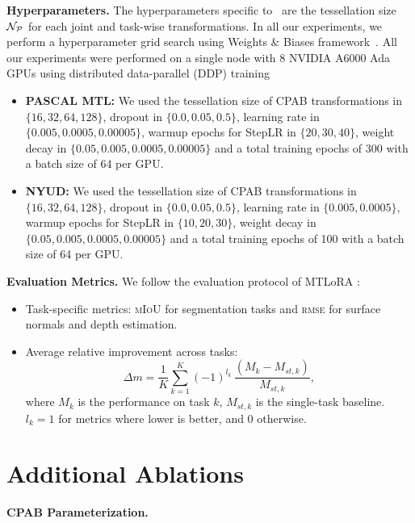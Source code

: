 \noindent\textbf{Hyperparameters.} The hyperparameters specific to \ourmethod\ are the tessellation size ${\mathcal{N}}_{\mathcal{P}}$ for each joint and task-wise transformations. In all our experiments, we perform a hyperparameter grid search using Weights \& Biases framework~\cite {wandb}. All our experiments were performed on a single node with 8 NVIDIA A6000 Ada GPUs using distributed data-parallel (DDP) training
\begin{itemize}
    \item \textbf{PASCAL MTL:} We used the tessellation size of CPAB transformations in $\{16, 32, 64, 128\}$, dropout in $\{0.0, 0.05, 0.5\}$, learning rate in $\{0.005, 0.0005, 0.00005\}$, warmup epochs for StepLR in $\{20, 30, 40\}$, weight decay in $\{0.05, 0.005, 0.0005, 0.00005\}$ and a total training epochs of 300 with a batch size of 64 per GPU.
    \item \textbf{NYUD:} We used the tessellation size of CPAB transformations in $\{16, 32, 64, 128\}$, dropout in $\{0.0, 0.05, 0.5\}$, learning rate in $\{0.005, 0.0005\}$, warmup epochs for StepLR in $\{10, 20, 30\}$, weight decay in $\{0.05, 0.005, 0.0005, 0.00005\}$ and a total training epochs of 100 with a batch size of 64 per GPU.
\end{itemize}


\noindent\textbf{Evaluation Metrics.} We follow the evaluation protocol of   MTLoRA \cite{agiza2024mtlora}:
\begin{itemize}
    \item Task-specific metrics: \textsc{mIoU} for segmentation tasks and \textsc{rmse} for surface normals and depth estimation.
    \item Average relative improvement across tasks:
    \begin{equation}
    \Delta m = \frac{1}{K} \sum\limits_{k=1}^K (-1)^{l_k}\,\frac{(M_k - M_{st, k})}{M_{st, k}},
    \end{equation}
    where $M_k$ is the performance on task $k$, $M_{st, k}$ is the single-task baseline. $l_k=1$ for metrics where lower is better, and 0 otherwise.
\end{itemize}

\section{Additional Ablations}
\noindent\textbf{CPAB Parameterization.} 


